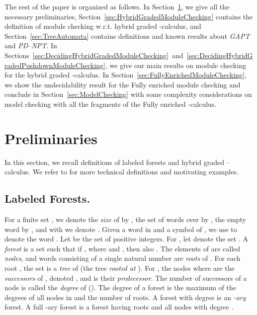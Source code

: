 \documentclass{LMCS}
\theoremstyle{plain}
\def \PDNPT         {\emph{PD--NPT}\xspace}
\def \TGAPT         {\emph{GAPT}\xspace}
\newcommand \ignore[1] {}
\begin{document}
\ignore{ Ricordarsi di dire qualcosa sul model checking per il
-calculus classico citando i lavori di Igor Walukiewicz e
altri (vedi anche citazioni di Igor Walukiewicz )

Ricordarsi di citare la survey sul -calculus del 2007 di
Stirling e Bradfield. }

The rest of the paper is organized as follows. In
Section~\ref{sec:Preliminaries}, we give all the necessary preliminaries,
Section~\ref{sec:HybridGradedModuleChecking} contains the definition of module
checking w.r.t. hybrid graded -calculus, and
Section~\ref{sec:TreeAutomata} contains definitions and known results about
\TGAPT and \PDNPT. In
Sections~\ref{sec:DecidingHybridGradedModuleChecking}~and~\ref{sec:DecidingHybridGradedPushdownModuleChecking},
we give our main results on module checking for the hybrid graded
-calculus. In Section~\ref{sec:FullyEnrichedModuleChecking}, we show the
undecidability result for the Fully enriched module checking and conclude in
Section~\ref{sec:ModelChecking} with some complexity considerations on model
checking with all the fragments of the Fully enriched -calculus.

\section{Preliminaries}\label{sec:Preliminaries}
In this section, we recall definitions of labeled forests and hybrid graded
--calculus. We refer to \cite{BLMV06} for more technical definitions and
motivating examples.

\subsection{Labeled Forests.}\label{sub:LabeledForests} For a
finite set , we denote the \emph{size} of  by , the set
of words over  by , the empty word by , and
with  we denote . Given a word
 in  and a symbol  of , we use  to denote
the word . Let  be the set of positive integers.
For , let  denote the set . A \emph{forest} is a set  such that if
, where  and , then
also . The elements of  are called \emph{nodes}, and
words consisting of a single natural number are \emph{roots} of
. For each root , the set  is a \emph{tree} of  (the tree
\emph{rooted at }). For , the nodes 
where  are the \emph{successors} of , denoted
, and  is their \emph{predecessor}. The number of
successors of a node  is called the \emph{degree} of 
(). The degree  of a forest  is the maximum of the
degrees of all nodes in  and the number of roots. A forest with
degree  is an \emph{-ary} forest. A full -ary forest is a
forest having  roots and all nodes with degree .
\end{document}
